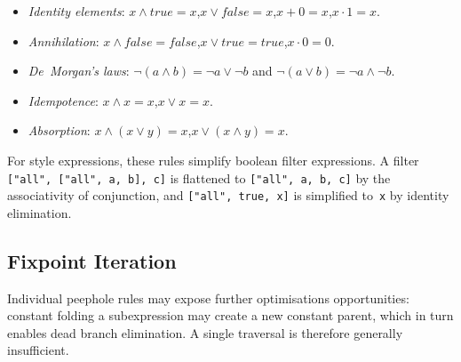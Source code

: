 \begin{itemize}
    \item \emph{Identity elements}: $x \land \mathit{true} = x$,\quad $x \lor \mathit{false} = x$,\quad $x + 0 = x$,\quad $x \cdot 1 = x$.
    \item \emph{Annihilation}: $x \land \mathit{false} = \mathit{false}$,\quad $x \lor \mathit{true} = \mathit{true}$,\quad $x \cdot 0 = 0$.
    \item \emph{De~Morgan's laws}: $\lnot (a \land b) = \lnot a \lor \lnot b$ and $\lnot (a \lor b) = \lnot a \land \lnot b$.
    \item \emph{Idempotence}: $x \land x = x$,\quad $x \lor x = x$.
    \item \emph{Absorption}: $x \land (x \lor y) = x$,\quad $x \lor (x \land y) = x$.
\end{itemize}

For style expressions, these rules simplify boolean filter expressions.
A filter \texttt{["all", ["all", a, b], c]} is flattened to \texttt{["all", a, b, c]} by the associativity of conjunction, and \texttt{["all", true, x]} is simplified to~\texttt{x} by identity elimination.

\subsection{Fixpoint Iteration}\label{sub_fixpoint}

Individual peephole rules may expose further optimisations opportunities: constant folding a subexpression may create a new constant parent, which in turn enables dead branch elimination.
A single traversal is therefore generally insufficient.

